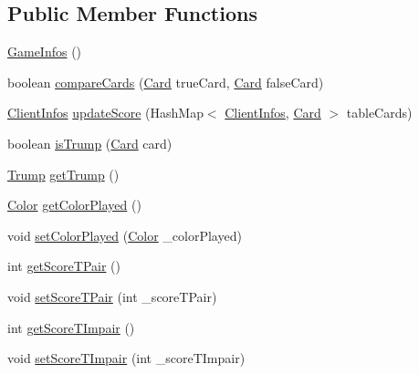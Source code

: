 \subsection*{Public Member Functions}
\begin{DoxyCompactItemize}
\item 
\mbox{\hyperlink{classServer_1_1Game_1_1GameInfos_a548b3ab8fe42f46062df51f915583b2f}{Game\+Infos}} ()
\item 
boolean \mbox{\hyperlink{classServer_1_1Game_1_1GameInfos_afdd2e6dddeba900ee192cd8f6f3442e0}{compare\+Cards}} (\mbox{\hyperlink{classCommon_1_1Card}{Card}} true\+Card, \mbox{\hyperlink{classCommon_1_1Card}{Card}} false\+Card)
\item 
\mbox{\hyperlink{classServer_1_1ServerConnexion_1_1ClientInfos}{Client\+Infos}} \mbox{\hyperlink{classServer_1_1Game_1_1GameInfos_a29835c070042dbf7eaea067e6c9acbf4}{update\+Score}} (Hash\+Map$<$ \mbox{\hyperlink{classServer_1_1ServerConnexion_1_1ClientInfos}{Client\+Infos}}, \mbox{\hyperlink{classCommon_1_1Card}{Card}} $>$ table\+Cards)
\item 
boolean \mbox{\hyperlink{classServer_1_1Game_1_1GameInfos_a7375e63b9b1bb2da69ca50884030ab46}{is\+Trump}} (\mbox{\hyperlink{classCommon_1_1Card}{Card}} card)
\item 
\mbox{\hyperlink{enumCommon_1_1Trump}{Trump}} \mbox{\hyperlink{classServer_1_1Game_1_1GameInfos_a973c5cddda8e6361dd5910a62bb8fe6e}{get\+Trump}} ()
\item 
\mbox{\hyperlink{enumCommon_1_1Color}{Color}} \mbox{\hyperlink{classServer_1_1Game_1_1GameInfos_a2e0075e9e244adeae6ecbda6ab2ea252}{get\+Color\+Played}} ()
\item 
void \mbox{\hyperlink{classServer_1_1Game_1_1GameInfos_abd39ccfe5a7b2710dba08bc67fbcb421}{set\+Color\+Played}} (\mbox{\hyperlink{enumCommon_1_1Color}{Color}} \+\_\+color\+Played)
\item 
int \mbox{\hyperlink{classServer_1_1Game_1_1GameInfos_a36954ba202b1300ef2bd102925e2b196}{get\+Score\+T\+Pair}} ()
\item 
void \mbox{\hyperlink{classServer_1_1Game_1_1GameInfos_a03dad68606bf732a16e9928095ec88ad}{set\+Score\+T\+Pair}} (int \+\_\+score\+T\+Pair)
\item 
int \mbox{\hyperlink{classServer_1_1Game_1_1GameInfos_a5d560799c8160a1d66e64b41ba421e28}{get\+Score\+T\+Impair}} ()
\item 
void \mbox{\hyperlink{classServer_1_1Game_1_1GameInfos_a8fd38587588e0006f206ab4db8ecccd9}{set\+Score\+T\+Impair}} (int \+\_\+score\+T\+Impair)
\item 

\end{DoxyCompactItemize}
